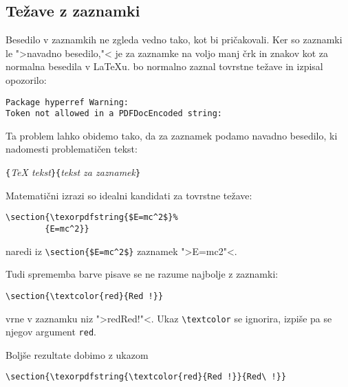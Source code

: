 \subsection{Težave z zaznamki}

Besedilo v zaznamkih ne zgleda vedno tako, kot bi pričakovali. Ker so
zaznamki le ">navadno besedilo,"< je za zaznamke na voljo manj
črk in znakov kot za normalna besedila v \LaTeX{}u.
 bo normalno zaznal tovrstne težave in izpisal
opozorilo:
\begin{code}
\begin{verbatim}
Package hyperref Warning: 
Token not allowed in a PDFDocEncoded string:
\end{verbatim}
\end{code}
Ta problem lahko obidemo tako, da 
za zaznamek podamo navadno besedilo, ki nadomesti problematičen
tekst:
\begin{lscommand}
\verb|{|\emph{\TeX{} tekst}\verb|}{|\emph{tekst za zaznamek}\verb|}|
\end{lscommand}

Matematični izrazi so idealni kandidati za tovrstne težave:
\begin{code}
\begin{verbatim}
\section{\texorpdfstring{$E=mc^2$}%
        {E=mc^2}}
\end{verbatim}
\end{code}
naredi iz \verb+\section{$E=mc^2$}+ zaznamek ">E=mc2"<.

Tudi sprememba barve pisave se ne razume najbolje z zaznamki:
\begin{code}
\verb+\section{\textcolor{red}{Red !}}+
\end{code}
vrne v zaznamku niz ">redRed!"<. Ukaz \verb+\textcolor+ se ignorira,
izpiše pa se njegov argument \texttt{red}. 

Boljše rezultate dobimo z ukazom
\begin{code}
\verb+\section{\texorpdfstring{\textcolor{red}{Red !}}{Red\ !}}+
\end{code}


